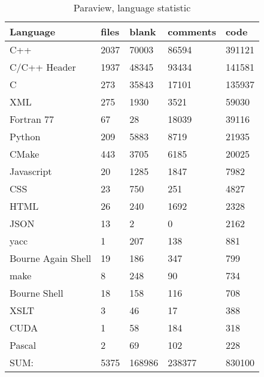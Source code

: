 \begin{table}[h]
	\centering
	\caption{Paraview, language statistic}
    \sffamily 
	\begin{tabular}{ l|l|l|l|l }
		\hline
		\textbf{Language}              &\textbf{files} &\textbf{blank} &\textbf{comments} & \textbf{code} \\
		\hline
		C++                            &2037          &70003         &86594         & 391121\\
		C/C++ Header                   &1937          &48345         & 93434        & 141581\\
		C                              & 273          &35843         & 17101        & 135937\\
		XML                            & 275          & 1930         &  3521        &  59030\\
		Fortran 77                     &  67          &   28         & 18039        &  39116\\
		Python                         & 209          & 5883         &  8719        &  21935\\
		CMake                          & 443          & 3705         &  6185        &  20025\\
		Javascript                     &  20          & 1285         &  1847        &   7982\\
		CSS                            &  23          &  750         &   251        &   4827\\
		HTML                           &  26          &  240         &  1692        &   2328\\
		JSON                           &  13          &    2         &     0        &   2162\\
		yacc                           &   1          &  207         &   138        &    881\\
		Bourne Again Shell             &  19          &  186         &   347        &    799\\
		make                           &   8          &  248         &    90        &    734\\
		Bourne Shell                   &  18          &  158         &   116        &    708\\
		XSLT                           &   3          &   46         &    17        &    388\\
		CUDA                           &   1          &   58         &   184        &    318\\
		Pascal                         &   2          &   69         &   102        &    228\\
		\hline
		SUM:                           &5375         &168986         &238377         &830100\\
		\hline
	\end{tabular}
    \normalfont
    \label{table:ParaviewStatistic}
\end{table}

